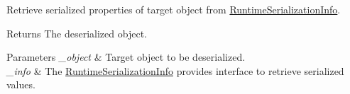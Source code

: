 Retrieve serialized properties of target object from \hyperlink{class_voxel_busters_1_1_runtime_serialization_1_1_runtime_serialization_info}{Runtime\+Serialization\+Info}. 

\begin{DoxyReturn}{Returns}
The deserialized object.
\end{DoxyReturn}

\begin{DoxyParams}{Parameters}
{\em \+\_\+object} & Target object to be deserialized.\\
\hline
{\em \+\_\+info} & The \hyperlink{class_voxel_busters_1_1_runtime_serialization_1_1_runtime_serialization_info}{Runtime\+Serialization\+Info} provides interface to retrieve serialized values.\\
\hline
\end{DoxyParams}

